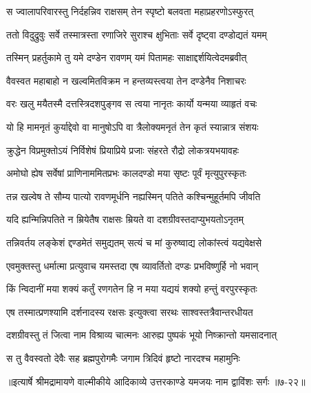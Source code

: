 \twolineshloka
{स ज्वालापरिवारस्तु निर्दहन्निव राक्षसम्}
{तेन स्पृष्टो बलवता महाप्रहरणोऽस्फुरत्} %

\twolineshloka
{ततो विदुद्रुवुः सर्वे तस्मात्रस्ता रणाजिरे}
{सुराश्च क्षुभिताः सर्वे दृष्ट्वा दण्डोद्यतं यमम्} %

\twolineshloka
{तस्मिन् प्रहर्तुकामे तु यमे दण्डेन रावणम्}
{यमं पितामहः साक्षाद्दर्शयित्वेदमब्रवीत्} %

\twolineshloka
{वैवस्वत महाबाहो न खल्वमितविक्रम}
{न हन्तव्यस्त्वया तेन दण्डेनैव निशाचरः} %

\twolineshloka
{वरः खलु मयैतस्मै दत्तस्त्रिदशपुङ्गव}
{स त्वया नानृतः कार्यो यन्मया व्याहृतं वचः} %

\twolineshloka
{यो हि मामनृतं कुर्याद्देवो वा मानुषोऽपि वा}
{त्रैलोक्यमनृतं तेन कृतं स्यान्नात्र संशयः} %

\twolineshloka
{क्रुद्धेन विप्रमुक्तोऽयं निर्विशेषं प्रियाप्रिये}
{प्रजाः संहरते रौद्रो लोकत्रयभयावहः} %

\twolineshloka
{अमोघो ह्येष सर्वेषां प्राणिनाममितप्रभः}
{कालदण्डो मया सृष्टः पूर्वं मृत्युपुरस्कृतः} %

\twolineshloka
{तन्न खल्वेष ते सौम्य पात्यो रावणमूर्धनि}
{नह्यस्मिन् पतिते कश्चिन्मुहूर्तमपि जीवति} %

\twolineshloka
{यदि ह्यन्मिन्निपतिते न म्रियेतैष राक्षसः}
{म्रियते वा दशग्रीवस्तदाप्युभयतोऽनृतम्} %

\twolineshloka
{तन्निवर्तय लङ्केशं द्दण्डमेतं समुद्यतम्}
{सत्यं च मां कुरुष्वाद्य लोकांस्त्वं यद्यवेक्षसे} %

\twolineshloka
{एवमुक्तस्तु धर्मात्मा प्रत्युवाच यमस्तदा}
{एष व्यावर्तितो दण्डः प्रभविष्णुर्हि नो भवान्} %

\twolineshloka
{किं न्विदानीं मया शक्यं कर्तुं रणगतेन हि}
{न मया यद्ययं शक्यो हन्तुं वरपुरस्कृतः} %

\twolineshloka
{एष तस्मात्प्रणश्यामि दर्शनादस्य रक्षसः}
{इत्युक्त्वा सरथः साश्वस्तत्रैवान्तरधीयत} %

\twolineshloka
{दशग्रीवस्तु तं जित्वा नाम विश्राव्य चात्मनः}
{आरुह्य पुष्पकं भूयो निष्क्रान्तो यमसादनात्} %

\twolineshloka
{स तु वैवस्वतो देवैः सह ब्रह्मपुरोगमैः}
{जगाम त्रिदिवं हृष्टो नारदश्च महामुनिः} %


॥इत्यार्षे श्रीमद्रामायणे वाल्मीकीये आदिकाव्ये उत्तरकाण्डे यमजयः नाम द्वाविंशः सर्गः ॥७-२२॥
